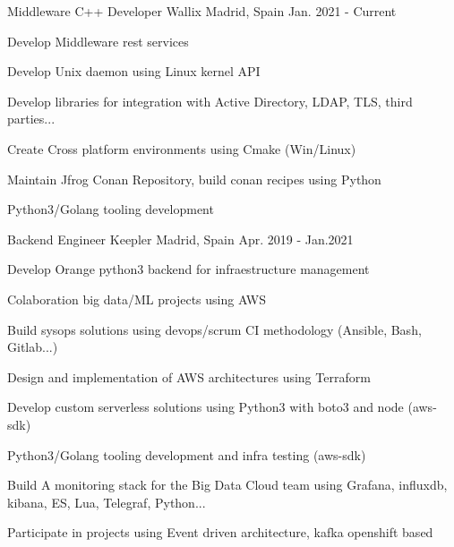 

\begin{cventries}

  \cventry
    {Middleware C++ Developer} %
    {Wallix} %
    {Madrid, Spain} %
    {Jan. 2021 - Current} %
    {
      \begin{cvitems} %
        \item {Develop Middleware rest services}
        \item {Develop Unix daemon using Linux kernel API}
        \item {Develop libraries for integration with Active Directory, LDAP, TLS, third parties...}
        \item {Create Cross platform environments using Cmake (Win/Linux)}
        \item {Maintain Jfrog Conan Repository, build conan recipes using Python} 
        \item {Python3/Golang tooling development}
      \end{cvitems}
    }
  \cventry
    {Backend Engineer} %
    {Keepler} %
    {Madrid, Spain} %
    {Apr. 2019 - Jan.2021} %
    {
      \begin{cvitems} %
        \item {Develop Orange python3 backend for infraestructure management}
        \item {Colaboration big data/ML projects using AWS}
        \item {Build sysops solutions using devops/scrum CI methodology (Ansible, Bash, Gitlab...)}
        \item {Design and implementation of AWS architectures using Terraform}
        \item {Develop custom serverless solutions using Python3 with boto3 and node (aws-sdk)} 
        \item {Python3/Golang tooling development and infra testing (aws-sdk)} 
        \item {Build A monitoring stack for the Big Data Cloud team using Grafana, influxdb, kibana, ES, Lua, Telegraf, Python...} 
        \item {Participate in projects using Event driven architecture, kafka openshift based} 
      \end{cvitems}
    }


\end{cventries}
